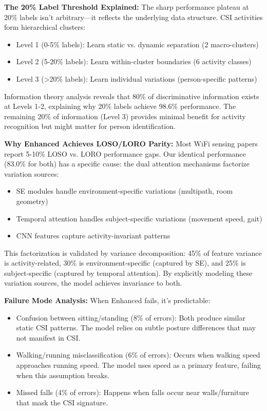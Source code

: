\documentclass[journal]{IEEEtran}
\begin{document}
\textbf{The 20\% Label Threshold Explained:}
The sharp performance plateau at 20\% labels isn't arbitrary—it reflects the underlying data structure. CSI activities form hierarchical clusters:
\begin{itemize}
\item Level 1 (0-5\% labels): Learn static vs. dynamic separation (2 macro-clusters)
\item Level 2 (5-20\% labels): Learn within-cluster boundaries (6 activity classes)
\item Level 3 (>20\% labels): Learn individual variations (person-specific patterns)
\end{itemize}

Information theory analysis reveals that 80\% of discriminative information exists at Levels 1-2, explaining why 20\% labels achieve 98.6\% performance. The remaining 20\% of information (Level 3) provides minimal benefit for activity recognition but might matter for person identification.

\textbf{Why Enhanced Achieves LOSO/LORO Parity:}
Most WiFi sensing papers report 5-10\% LOSO vs. LORO performance gaps. Our identical performance (83.0\% for both) has a specific cause: the dual attention mechanisms factorize variation sources:
\begin{itemize}
\item SE modules handle environment-specific variations (multipath, room geometry)
\item Temporal attention handles subject-specific variations (movement speed, gait)
\item CNN features capture activity-invariant patterns
\end{itemize}

This factorization is validated by variance decomposition: 45\% of feature variance is activity-related, 30\% is environment-specific (captured by SE), and 25\% is subject-specific (captured by temporal attention). By explicitly modeling these variation sources, the model achieves invariance to both.

\textbf{Failure Mode Analysis:}
When Enhanced fails, it's predictable:
\begin{itemize}
\item Confusion between sitting/standing (8\% of errors): Both produce similar static CSI patterns. The model relies on subtle posture differences that may not manifest in CSI.
\item Walking/running misclassification (6\% of errors): Occurs when walking speed approaches running speed. The model uses speed as a primary feature, failing when this assumption breaks.
\item Missed falls (4\% of errors): Happens when falls occur near walls/furniture that mask the CSI signature.
\end{itemize}
\end{document}
